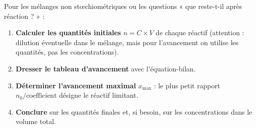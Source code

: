 \documentclass[11pt]{article}
\newcommand{\cle}[1]{{\popxbold\color{popdark}#1}}
\begin{document}
\begin{methode}
Pour les mélanges non stœchiométriques ou les questions « que reste-t-il après réaction ? » :
\begin{enumerate}
\item \textbf{Calculer les quantités initiales} $n=C\times V$ de chaque réactif (attention : dilution éventuelle dans le mélange, mais pour l'avancement on utilise les quantités, pas les concentrations).
\item \textbf{Dresser le tableau d'avancement} avec l'équation-bilan.
\item \textbf{Déterminer l'avancement maximal} $x_{\max}$ : le plus petit rapport $n_{0}/\text{coefficient}$ désigne le \cle{réactif limitant}.
\item \textbf{Conclure} sur les quantités finales et, si besoin, sur les concentrations dans le volume total.
\end{enumerate}
\end{methode}
\end{document}

